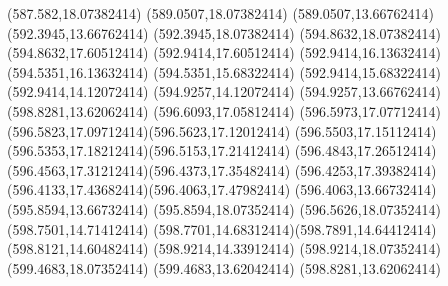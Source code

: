 {{	\lineto(587.582,18.07382414)
	\lineto(589.0507,18.07382414)
	\lineto(589.0507,13.66762414)
	\closepath
	\moveto(592.3945,13.66762414)
	\lineto(592.3945,18.07382414)
	\lineto(594.8632,18.07382414)
	\lineto(594.8632,17.60512414)
	\lineto(592.9414,17.60512414)
	\lineto(592.9414,16.13632414)
	\lineto(594.5351,16.13632414)
	\lineto(594.5351,15.68322414)
	\lineto(592.9414,15.68322414)
	\lineto(592.9414,14.12072414)
	\lineto(594.9257,14.12072414)
	\lineto(594.9257,13.66762414)
	\closepath
	\moveto(598.8281,13.62062414)
	\lineto(596.6093,17.05812414)
	\curveto(596.5973,17.07712414)(596.5823,17.09712414)(596.5623,17.12012414)
	\curveto(596.5503,17.15112414)(596.5353,17.18212414)(596.5153,17.21412414)
	\curveto(596.4843,17.26512414)(596.4563,17.31212414)(596.4373,17.35482414)
	\curveto(596.4253,17.39382414)(596.4133,17.43682414)(596.4063,17.47982414)
	\lineto(596.4063,13.66732414)
	\lineto(595.8594,13.66732414)
	\lineto(595.8594,18.07352414)
	\lineto(596.5626,18.07352414)
	\lineto(598.7501,14.71412414)
	\curveto(598.7701,14.68312414)(598.7891,14.64412414)(598.8121,14.60482414)
	\lineto(598.9214,14.33912414)
	\lineto(598.9214,18.07352414)
	\lineto(599.4683,18.07352414)
	\lineto(599.4683,13.62042414)
	\closepath
	\moveto(598.8281,13.62062414)
}
}

